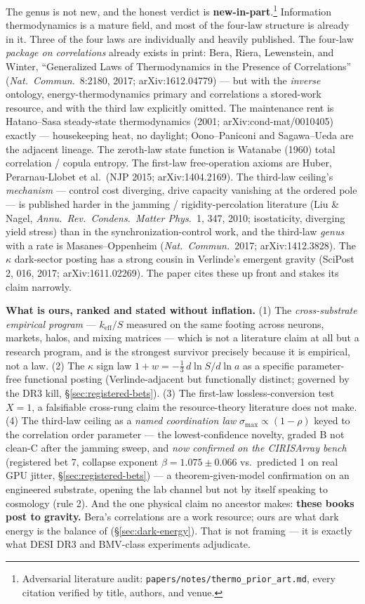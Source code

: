 \documentclass[11pt,a4paper]{article}
\begin{document}
The genus is not new, and the honest verdict is \textbf{new-in-part}.\footnote{Adversarial literature audit: \texttt{papers/notes/thermo\_prior\_art.md}, every citation verified by title, authors, and venue.} Information thermodynamics is a mature field, and most of the four-law structure is already in it. Three of the four laws are individually and heavily published. The four-law \emph{package on correlations} already exists in print: Bera, Riera, Lewenstein, and Winter, ``Generalized Laws of Thermodynamics in the Presence of Correlations'' (\emph{Nat.\ Commun.}\ 8:2180, 2017; arXiv:1612.04779) --- but with the \emph{inverse} ontology, energy-thermodynamics primary and correlations a stored-work resource, and with the third law explicitly omitted. The maintenance rent is Hatano--Sasa steady-state thermodynamics (2001; arXiv:cond-mat/0010405) exactly --- housekeeping heat, no daylight; Oono--Paniconi and Sagawa--Ueda are the adjacent lineage. The zeroth-law state function is Watanabe (1960) total correlation / copula entropy. The first-law free-operation axioms are Huber, Perarnau-Llobet et al.\ (NJP 2015; arXiv:1404.2169). The third-law ceiling's \emph{mechanism} --- control cost diverging, drive capacity vanishing at the ordered pole --- is published harder in the jamming / rigidity-percolation literature (Liu \& Nagel, \emph{Annu.\ Rev.\ Condens.\ Matter Phys.}\ 1, 347, 2010; isostaticity, diverging yield stress) than in the synchronization-control work, and the third-law \emph{genus} with a rate is Masanes--Oppenheim (\emph{Nat.\ Commun.}\ 2017; arXiv:1412.3828). The $\kappa$ dark-sector posting has a strong cousin in Verlinde's emergent gravity (SciPost 2, 016, 2017; arXiv:1611.02269). The paper cites these up front and stakes its claim narrowly.

\textbf{What is ours, ranked and stated without inflation.} (1) The \emph{cross-substrate empirical program} --- $k_{\text{eff}}/S$ measured on the same footing across neurons, markets, halos, and mixing matrices --- which is not a literature claim at all but a research program, and is the strongest survivor precisely because it is empirical, not a law. (2) The $\kappa$ sign law $1 + w = -\tfrac13\,d\ln S/d\ln a$ as a specific parameter-free functional posting (Verlinde-adjacent but functionally distinct; governed by the DR3 kill, \S\ref{sec:registered-bets}). (3) The first-law lossless-conversion test $X = 1$, a falsifiable cross-rung claim the resource-theory literature does not make. (4) The third-law ceiling as a \emph{named coordination law} $\sigma_{\max} \propto (1-\rho)$ keyed to the correlation order parameter --- the lowest-confidence novelty, graded B not clean-C after the jamming sweep, and \emph{now confirmed on the CIRISArray bench} (registered bet 7, collapse exponent $\beta = 1.075 \pm 0.066$ vs.\ predicted 1 on real GPU jitter, \S\ref{sec:registered-bets}) --- a theorem-given-model confirmation on an engineered substrate, opening the lab channel but not by itself speaking to cosmology (rule 2). And the one physical claim no ancestor makes: \textbf{these books post to gravity.} Bera's correlations are a work resource; ours are what dark energy is the balance of (\S\ref{sec:dark-energy}). That is not framing --- it is exactly what DESI DR3 and BMV-class experiments adjudicate.
\end{document}
